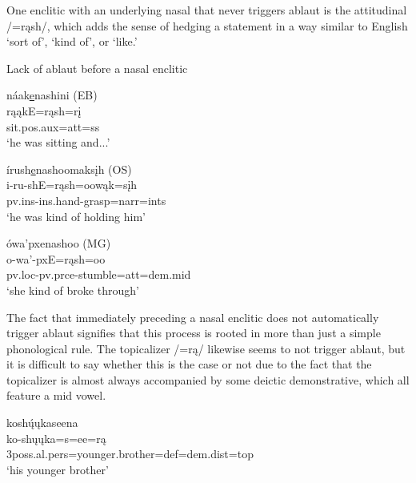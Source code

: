One enclitic with an underlying nasal that never triggers ablaut is the attitudinal /=rąsh/, which adds the sense of hedging a statement in a way similar to English `sort of', `kind of', or `like.'

\begin{exe}
\item\label{noablaut} Lack of ablaut before a nasal enclitic

	\begin{xlist}
	\item\label{noablaut1}
	\glll náak\uline{e}nashini \textnormal{(EB)}\\
	rąąkE=rąsh=rį\\
	\textnormal{sit}.pos.aux=att=ss\\
	\glt `he was sitting and...' \citep[110]{trechter2012b}

	\item\label{noablaut2}
	\glll írush\uline{e}nashoomaksįh \textnormal{(OS)}\\
	i-ru-shE=rąsh=oowąk=sįh\\
	pv.ins-ins.hand-\textnormal{grasp}=narr=ints\\
	\glt `he was kind of holding him' \citep[45]{hollow1973a}

	\item\label{noablaut3}
	\glll ówa'pxenashoo \textnormal{(MG)}\\
	o-wa'-pxE=rąsh=oo\\
	pv.loc-pv.prce-\textnormal{stumble}=att=dem.mid\\
	\glt `she kind of broke through' \citep[81]{hollow1973a}

	\end{xlist}

\end{exe}

The fact that immediately preceding a nasal enclitic does not automatically trigger ablaut signifies that this process is rooted in more than just a simple phonological rule. The topicalizer /=rą/ likewise seems to not trigger ablaut, but it is difficult to say whether this is the case or not due to the fact that the topicalizer is almost always accompanied by some deictic demonstrative, which all feature a mid vowel.

\begin{exe}
\item\label{turtlefootnote} \glll	koshų́ųkaseena\\
	ko-shųųka=s=ee=rą\\
	3poss.al.pers=\textnormal{younger.brother}=def=dem.dist=top\\
\glt	`his younger brother' \citep[141]{trechter2012b}
\end{exe}

